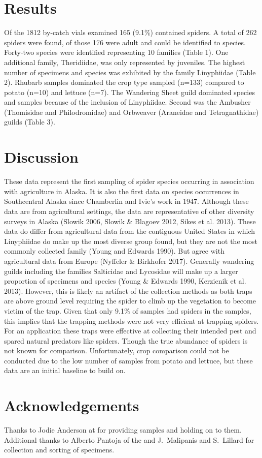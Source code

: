 \section{Results}
Of the 1812 by-catch vials examined 165 (9.1\%) contained spiders. A total of 262 spiders were found, of those 176 were adult and could be identified to species. Forty-two species were identified representing 10 families (Table 1). One additional family, Theridiidae, was only represented by juveniles. The highest number of specimens and species was exhibited by the family Linyphiidae (Table 2). Rhubarb samples dominated the crop type sampled (n=133) compared to potato (n=10) and lettuce (n=7). The Wandering Sheet guild dominated species and samples because of the inclusion of Linyphiidae. Second was the Ambusher (Thomisidae and Philodromidae) and Orbweaver (Araneidae and Tetragnathidae) guilds (Table 3). 

\section{Discussion}

These data represent the first sampling of spider species occurring in association with agriculture in Alaska. It is also the first data on species occurrences in Southcentral Alaska since Chamberlin and Ivie’s work in 1947. Although these data are from agricultural settings, the data are representative of other diversity surveys in Alaska (Slowik 2006, Slowik \& Blagoev 2012, Sikes et al. 2013). These data do differ from agricultural data from the contiguous United States in which Linyphiidae do make up the most diverse group found, but they are not the most commonly collected family (Young and Edwards 1990). But agree with agricultural data from Europe (Nyffeler \& Birkhofer 2017). Generally wandering guilds including the families Salticidae and Lycosidae will make up a larger proportion of specimens and species (Young \& Edwards 1990, Kerzicnik et al. 2013). However, this is likely an artifact of the collection methods as both traps are above ground level requiring the spider to climb up the vegetation to become victim of the trap. Given that only 9.1\% of samples had spiders in the samples, this implies that the trapping methods were not very efficient at trapping spiders. For an  application these traps were effective at collecting their intended pest and spared natural predators like spiders. Though the true abundance of spiders is not known for comparison. Unfortunately, crop comparison could not be conducted due to the low number of samples from potato and lettuce, but these data are an initial baseline to build on. 

\section{Acknowledgements}

Thanks to Jodie Anderson at  for providing samples and holding on to them. Additional thanks to Alberto Pantoja of the  and J.\ Malipanis and S.\ Lillard for collection and sorting of specimens. 
